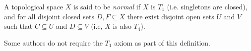 \documentclass[12pt]{article}
\begin{document}
A topological space $X$ is said to be \emph{normal} if $X$ is $T_1$ (i.e. singletons are closed), and for all disjoint closed sets $D,F\subseteq X$ there exist disjoint open sets $U$ and $V$ such that $C\subseteq U$ and $D\subseteq V$ (i.e, $X$ is also $T_4$).

Some authors do not require the $T_1$ axiom as part of this definition.
\end{document}
